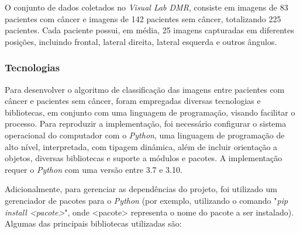 O conjunto de dados coletados no \textit{Visual Lab DMR}, consiste em imagens de 83 pacientes com câncer e imagens de 142 pacientes sem câncer, totalizando 225 pacientes. Cada paciente possui, em média, 25 imagens capturadas em diferentes posições, incluindo frontal, lateral direita, lateral esquerda e outros ângulos.



\subsubsection{\esp Tecnologias} \label{techs}
Para desenvolver o algoritmo de classificação das imagens entre pacientes com câncer e pacientes sem câncer, foram empregadas diversas tecnologias e bibliotecas, em conjunto com uma linguagem de programação, visando facilitar o processo. Para reproduzir a implementação, foi necessário configurar o sistema operacional do computador com o \textit{Python}, uma linguagem de programação de alto nível, interpretada, com tipagem dinâmica, além de incluir orientação a objetos, diversas bibliotecas e suporte a módulos e pacotes. A implementação requer o \textit{Python} com uma versão entre 3.7 e 3.10.


Adicionalmente, para gerenciar as dependências do projeto, foi utilizado um gerenciador de pacotes para o \textit{Python} (por exemplo, utilizando o comando "\textit{pip install <pacote>}", onde <pacote> representa o nome do pacote a ser instalado). Algumas das principais bibliotecas utilizadas são:

